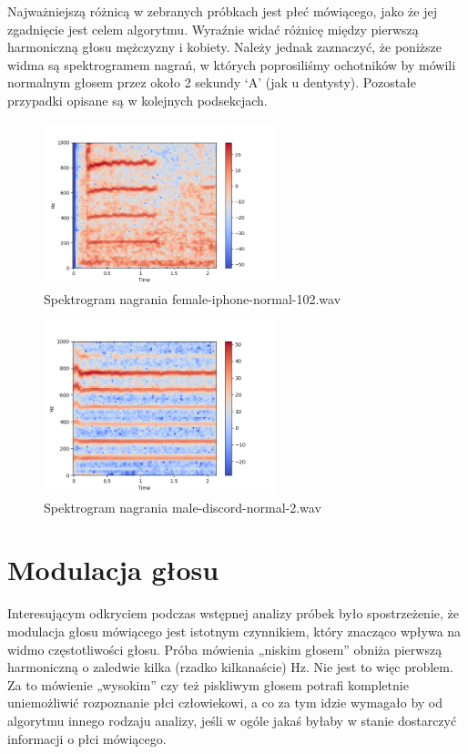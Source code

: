 \documentclass[a4paper,12pt]{extarticle}
\begin{document}
Najważniejszą różnicą w zebranych próbkach jest płeć mówiącego, jako że jej zgadnięcie jest celem algorytmu. Wyraźnie widać różnicę między pierwszą harmoniczną głosu mężczyzny i kobiety. Należy jednak zaznaczyć, że poniższe widma są spektrogramem nagrań, w których poprosiliśmy ochotników by mówili normalnym głosem przez około 2 sekundy ‘A’ (jak u dentysty). Pozostałe przypadki opisane są w kolejnych podsekcjach.

\begin{figure}[ht]
\centering
\includegraphics[width=0.6\textwidth]{4_female-iphone-normal-102.png}
\caption{ Spektrogram nagrania female-iphone-normal-102.wav}
\end{figure}

\begin{figure}[ht]
\centering
\includegraphics[width=0.6\textwidth]{4_male-discord-normal-2.png}
\caption{ Spektrogram nagrania male-discord-normal-2.wav}
\end{figure}

\newpage

\section*{Modulacja głosu}

Interesującym odkryciem podczas wstępnej analizy próbek było spostrzeżenie, że modulacja głosu mówiącego jest istotnym czynnikiem, który znacząco wpływa na widmo częstotliwości głosu. Próba mówienia „niskim głosem” obniża pierwszą harmoniczną o zaledwie kilka (rzadko kilkanaście) Hz. Nie jest to więc problem. Za to mówienie „wysokim” czy też piskliwym głosem potrafi kompletnie uniemożliwić rozpoznanie płci człowiekowi, a co za tym idzie wymagało by od algorytmu innego rodzaju analizy, jeśli w ogóle jakaś byłaby w stanie dostarczyć informacji o płci mówiącego.
\end{document}
